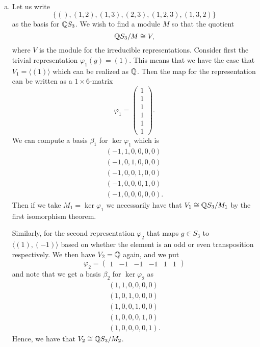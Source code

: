\documentclass[leqno]{article}
\begin{document}
\begin{solution}~
\begin{enumerate}[(a)]
    \item Let us write
    \[
    \{(),(1,2),(1,3),(2,3),(1,2,3),(1,3,2)\}
    \]
    as the basis for $\mathbb{Q} S_3$. We wish to find a module $M$ so that the quotient
    \[
    \mathbb{Q} S_3 / M \cong V,
    \]
    where $V$ is the module for the irreducible representations. Consider first the trivial representation $\varphi_1(g)=(1)$. This means that we have the case that $V_1=\langle (1)\rangle$ which can be realized as $\mathbb{Q}$. Then the map for the representation can be written as a $1\times 6$-matrix
    \[
    \varphi_1 = \begin{pmatrix} 1 \\ 1 \\ 1 \\ 1 \\ 1 \\ 1 \end{pmatrix}.
    \]
    We can compute a basis $\beta_1$ for $\ker \varphi_1$ which is
    \begin{align*}
        (-1,1,0,0,0,0)\\
        (-1,0,1,0,0,0)\\
        (-1,0,0,1,0,0)\\
        (-1,0,0,0,1,0)\\
        (-1,0,0,0,0,0).
    \end{align*}
    Then if we take $M_1= \ker \varphi_1$ we necessarily have that $V_1\cong \mathbb{Q} S_3/M_1$ by the first isomorphism theorem.
    
    Similarly, for the second representation $\varphi_2$ that maps $g\in S_3$ to $\langle (1),(-1)\rangle$ based on whether the element is an odd or even transposition respectively.   We then have $V_2=\mathbb{Q}$ again, and we put
    \[
    \varphi_2 = \begin{pmatrix} 1 & -1 & -1 & -1 & 1 & 1 \end{pmatrix}
    \]
    and note that we get a basis $\beta_2$ for $\ker \varphi_2$ as
    \begin{align*}
        (1,1,0,0,0,0)\\
        (1,0,1,0,0,0)\\
        (1,0,0,1,0,0)\\
        (1,0,0,0,1,0)\\
        (1,0,0,0,0,1).
    \end{align*}
    Hence, we have that $V_2\cong\mathbb{Q} S_3 / M_2$.
    

\end{enumerate}
\end{solution}
\end{document}
